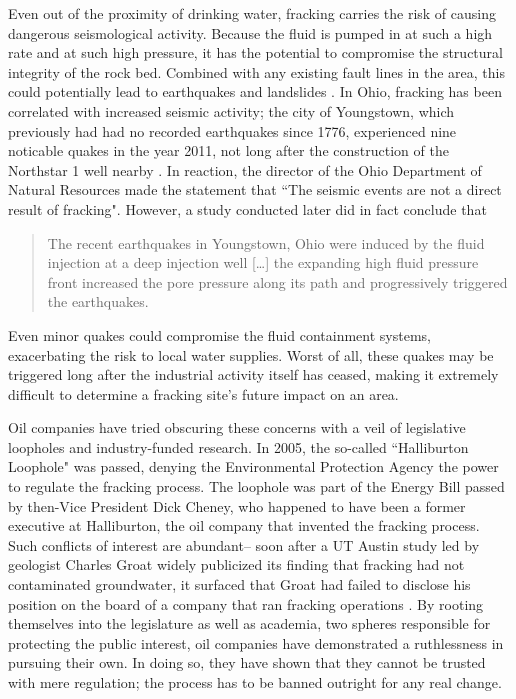 \documentclass[12pt,letterpaper]{article}
\begin{document}
Even out of the proximity of drinking water, fracking carries the risk of causing dangerous seismological activity. Because the fluid is pumped in at such a high rate and at such high pressure, it has the potential to compromise the structural integrity of the rock bed. Combined with any existing fault lines in the area, this could potentially lead to earthquakes and landslides \cite{quake}.
In Ohio, fracking has been correlated with increased seismic activity; the city of Youngstown, which previously had had no recorded earthquakes since 1776, experienced nine noticable quakes in the year 2011, not long after the construction of the Northstar 1 well nearby \cite{quake2}. In reaction, the director of the Ohio Department of Natural Resources made the statement that
``The seismic events are not a direct result of fracking". However, a study conducted later did in fact conclude that
\begin{quote}
The recent earthquakes in Youngstown, Ohio were induced by the fluid injection at a deep injection well [\ldots] the expanding high fluid pressure front increased the pore pressure along its path and progressively triggered the earthquakes. \cite[1]{quake3}
\end{quote}
Even minor quakes could compromise the fluid containment systems, exacerbating the risk to local water supplies. Worst of all, these quakes may be triggered long after the industrial activity itself has ceased, making it extremely difficult to determine a fracking site's future impact on an area.

Oil companies have tried obscuring these concerns with a veil of legislative loopholes and industry-funded research. In 2005, the so-called ``Halliburton Loophole" was passed, denying the Environmental Protection Agency the power to regulate the fracking process. The loophole was part of the Energy Bill passed by then-Vice President Dick Cheney, who happened to have been a former executive at Halliburton, the oil company that invented the fracking process. Such conflicts of interest are abundant-- soon after a UT Austin study led by geologist Charles Groat widely publicized its finding that fracking had not contaminated groundwater, it surfaced that Groat had failed to disclose his position on the board of a company that ran fracking operations \cite{groat}.
By rooting themselves into the legislature as well as academia, two spheres responsible for protecting the public interest, oil companies have demonstrated a ruthlessness in pursuing their own.
In doing so, they have shown that they cannot be trusted with mere regulation; the process has to be banned outright for any real change.




\makeworkscited
\end{document}
